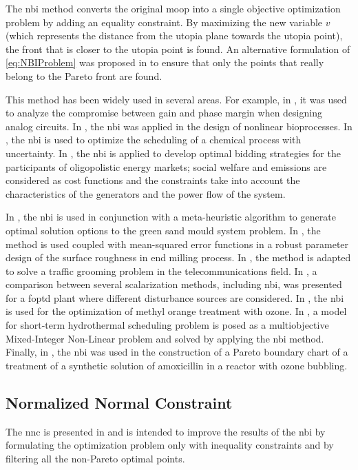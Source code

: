 The \gls{nbi} method converts the original \gls{moop} into a single objective optimization problem by adding an equality constraint. By maximizing the new variable $v$ (which represents the distance from the utopia plane towards the utopia point), the front that is closer to the utopia point is found. An alternative formulation of \eqref{eq:NBIProblem} was proposed in \citet{Shukla2007} to ensure that only the points that really belong to the Pareto front are found.

This method has been widely used in several areas. For example, in \citet{Stehr2003}, it was used to analyze the compromise between gain and phase margin when designing analog circuits. In \citet{Sendin2004}, the \gls{nbi} was applied in the design of nonlinear bioprocesses. In \citet{Ierapetritou2007a}, the \gls{nbi} is used to optimize the scheduling of a chemical process with uncertainty. In \citet{Vahidinasab2010}, the \gls{nbi} is applied to develop optimal bidding strategies for the participants of oligopolistic energy markets; social welfare and emissions are considered as cost functions and the constraints take into account the characteristics of the generators and the power flow of the system.

In \citet{Ganesan2013}, the \gls{nbi} is used in conjunction with a meta-heuristic algorithm to generate optimal solution options to the green sand mould system problem. In \citet{Brito2014}, the method is used coupled with mean-squared error functions in a robust parameter design of the surface roughness in end milling process. In \citet{Rubio-Largo2014}, the method is adapted to solve a traffic grooming problem in the telecommunications field. In \citet{Rojas2015b}, a comparison between several scalarization methods, including \gls{nbi}, was presented for a \gls{foptd} plant where different disturbance sources are considered. In \citet{Naves2017}, the \gls{nbi} is used for the optimization of methyl orange treatment with ozone. In \citet{Simab2018}, a model for short-term hydrothermal scheduling problem is posed as a multiobjective Mixed-Integer Non-Linear problem and solved by applying the \gls{nbi} method. Finally, in \citet{Moura2018}, the \gls{nbi} was used in the construction of a Pareto boundary chart of a treatment of a synthetic solution of amoxicillin in a reactor with ozone bubbling.
\subsection{Normalized Normal Constraint}
\label{sec:NNC}
The \gls{nnc} is presented in \citet{Messac2003} and is intended to improve the results of the \gls{nbi} by formulating the optimization problem only with inequality constraints and by filtering all the non-Pareto optimal points.

